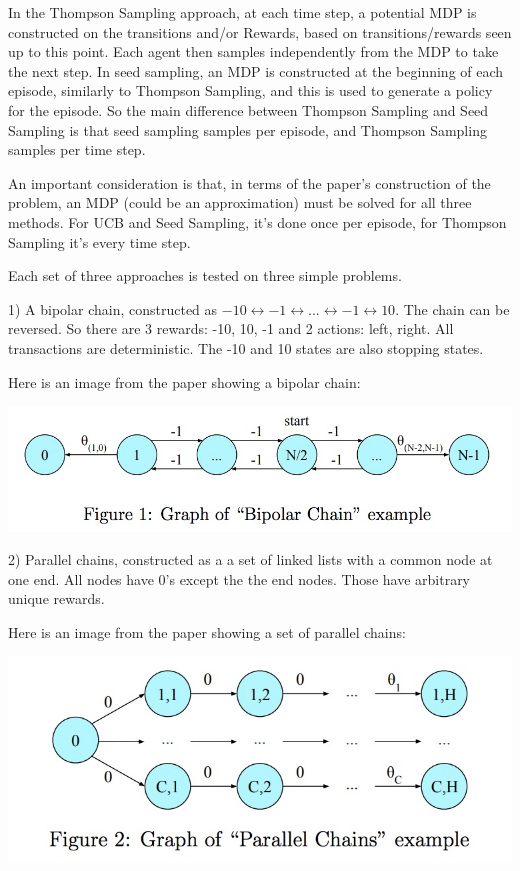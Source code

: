 \documentclass{article}
\begin{document}
In the Thompson Sampling approach, at each time step, a potential MDP is constructed on the transitions and/or Rewards, based on transitions/rewards seen up to this point. Each agent then samples independently from the MDP to take the next step. In seed sampling, an MDP is constructed at the beginning of each episode, similarly to Thompson Sampling, and this is used to generate a policy for the episode. So the main difference between Thompson Sampling and Seed Sampling is that seed sampling samples per episode, and Thompson Sampling samples per time step.

An important consideration is that, in terms of the paper's construction of the problem, an MDP (could be an approximation) must be solved for all three methods. For UCB and Seed Sampling, it's done once per episode, for Thompson Sampling it's every time step.

Each set of three approaches is tested on three simple problems.

1) A bipolar chain, constructed as $-10 \longleftrightarrow -1 \longleftrightarrow ... \longleftrightarrow -1 \longleftrightarrow 10$. The chain can be reversed. So there are 3 rewards: -10, 10, -1 and 2 actions: left, right. All transactions are deterministic. The -10 and 10 states are also stopping states.

Here is an image from the paper showing a bipolar chain:

\includegraphics[scale=.2]{bipolarchain.jpg}

2) Parallel chains, constructed as a a set of linked lists with a common node at one end. All nodes have 0's except the the end nodes. Those have arbitrary unique rewards.

Here is an image from the paper showing a set of parallel chains:

\includegraphics[scale=.2]{parallelchains.jpg}
\end{document}
